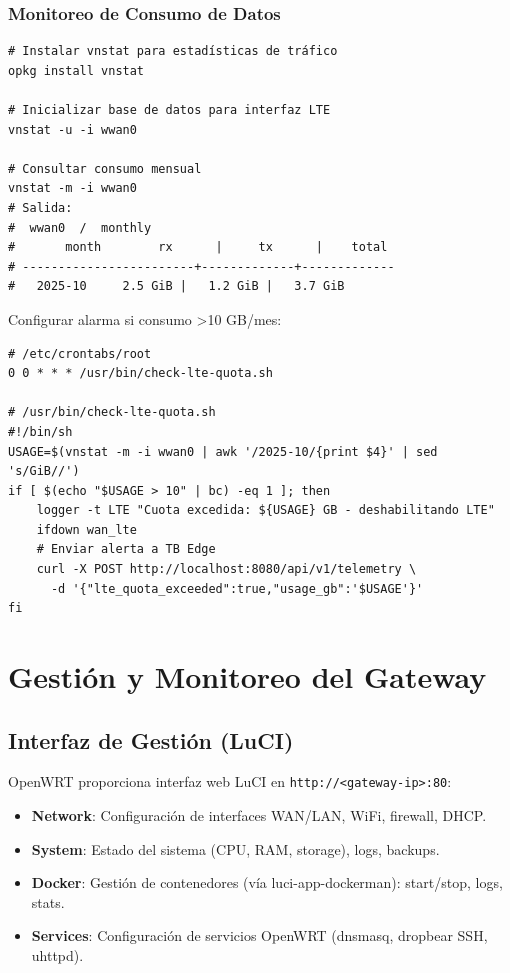 \subsubsection{Monitoreo de Consumo de Datos}

\begin{verbatim}
# Instalar vnstat para estadísticas de tráfico
opkg install vnstat

# Inicializar base de datos para interfaz LTE
vnstat -u -i wwan0

# Consultar consumo mensual
vnstat -m -i wwan0
# Salida:
#  wwan0  /  monthly
#       month        rx      |     tx      |    total
# ------------------------+-------------+-------------
#   2025-10     2.5 GiB |   1.2 GiB |   3.7 GiB
\end{verbatim}

Configurar alarma si consumo >10 GB/mes:
\begin{verbatim}
# /etc/crontabs/root
0 0 * * * /usr/bin/check-lte-quota.sh

# /usr/bin/check-lte-quota.sh
#!/bin/sh
USAGE=$(vnstat -m -i wwan0 | awk '/2025-10/{print $4}' | sed 's/GiB//')
if [ $(echo "$USAGE > 10" | bc) -eq 1 ]; then
    logger -t LTE "Cuota excedida: ${USAGE} GB - deshabilitando LTE"
    ifdown wan_lte
    # Enviar alerta a TB Edge
    curl -X POST http://localhost:8080/api/v1/telemetry \
      -d '{"lte_quota_exceeded":true,"usage_gb":'$USAGE'}'
fi
\end{verbatim}

\section{Gestión y Monitoreo del Gateway}

\subsection{Interfaz de Gestión (LuCI)}

OpenWRT proporciona interfaz web LuCI en \texttt{http://<gateway-ip>:80}:

\begin{itemize}
    \item \textbf{Network}: Configuración de interfaces WAN/LAN, WiFi, firewall, DHCP.
    \item \textbf{System}: Estado del sistema (CPU, RAM, storage), logs, backups.
    \item \textbf{Docker}: Gestión de contenedores (vía luci-app-dockerman): start/stop, logs, stats.
    \item \textbf{Services}: Configuración de servicios OpenWRT (dnsmasq, dropbear SSH, uhttpd).
\end{itemize}


